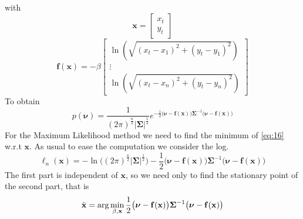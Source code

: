 \documentclass[12pt,twoside]{report}
\begin{document}
with
\begin{equation}
    \mathbf{x}=\begin{bmatrix}
    x_t\\
    y_t
    \end{bmatrix}
\end{equation}
\begin{equation}
    \mathbf{f}(\mathbf{x})=-\beta\begin{bmatrix}
\ln(\sqrt{(x_t-x_1)^2+(y_t-y_1)^2})\\
\vdots\\
\ln(\sqrt{(x_t-x_n)^2+(y_t-y_n)^2})
\end{bmatrix}
\end{equation}
To obtain
\begin{equation}
    p(\boldsymbol{\nu})=\frac{1}{(2\pi)^{\frac{n}{2}}|\boldsymbol{\Sigma}|^{\frac{1}{2}}}e^{-\frac{1}{2}\big(\boldsymbol{\nu}-\mathbf{f}(\mathbf{x})\big)\boldsymbol{\Sigma}^{-1}\big(\boldsymbol{\nu}-\mathbf{f}(\mathbf{x})\big)}
    \label{eq:16}
\end{equation}
For the Maximum Likelihood method we need to find the minimum of \ref{eq:16} w.r.t $\mathbf{x}$. As usual to ease the computation we consider the log. 
\begin{equation}
    \ell_n(\mathbf{x})=-\ln\big((2\pi)^{\frac{n}{2}}|\boldsymbol{\Sigma}|^{\frac{1}{2}}\big)-\frac{1}{2}\big(\boldsymbol{\nu}-\mathbf{f}(\mathbf{x})\big)\boldsymbol{\Sigma}^{-1}\big(\boldsymbol{\nu}-\mathbf{f}(\mathbf{x})\big)
\end{equation}
The first part is independent of $\mathbf{x}$, so we need only to find the stationary point of the second part, that is 
\begin{equation}
\Bar{\mathbf{x}}=\arg \min_{\beta,\mathbf{x}}\frac{1}{2}\big(\boldsymbol{\nu}-\mathbf{f}(\mathbf{x})\big)\boldsymbol{\Sigma}^{-1}\big(\boldsymbol{\nu}-\mathbf{f}(\mathbf{x})\big)
\end{equation}

\clearpage
\end{document}
